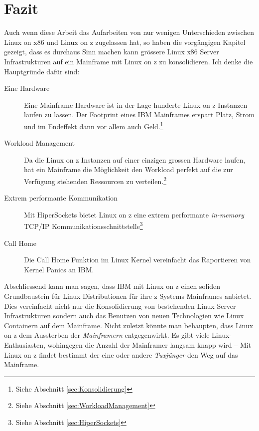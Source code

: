 \chapter{Fazit}
\label{cha:Schluss}

Auch wenn diese Arbeit das Aufarbeiten von nur wenigen Unterschieden zwischen Linux on x86 und Linux on z zugelassen hat, so haben die vorgängigen Kapitel gezeigt, dass es durchaus Sinn machen kann grössere Linux x86 Server Infrastrukturen auf ein Mainframe mit Linux on z zu konsolidieren.
Ich denke die Hauptgründe dafür sind:
\begin{description}
    \item[Eine Hardware]{Eine Mainframe Hardware ist in der Lage hunderte Linux on z Instanzen laufen zu lassen. Der Footprint eines IBM Mainframes erspart Platz, Strom und im Endeffekt dann vor allem auch Geld.\footnote{Siehe Abschnitt \ref{sec:Konsolidierung}}}
    \item[Workload Management]{Da die Linux on z Instanzen auf einer einzigen grossen Hardware laufen, hat ein Mainframe die Möglichkeit den Workload perfekt auf die zur Verfügung stehenden Ressourcen zu verteilen.\footnote{Siehe Abschnitt \ref{sec:WorkloadManagement}}}
    \item[Extrem performante Kommunikation]{Mit HiperSockets bietet Linux on z eine extrem performante \textit{in-memory} TCP/IP Kommunikationsschnittstelle\footnote{Siehe Abschnitt \ref{sec:HiperSockets}}}
    \item[Call Home]{Die Call Home Funktion im Linux Kernel vereinfacht das Raportieren von Kernel Panics an IBM.}
\end{description}

Abschliessend kann man sagen, dass IBM mit Linux on z einen soliden Grundbaustein für Linux Distributionen für ihre z Systems Mainframes anbietet. Dies vereinfacht nicht nur die Konsolidierung von bestehenden Linux Server Infrastrukturen sondern auch das Benutzen von neuen Technologien wie Linux Containern auf dem Mainframe.
Nicht zuletzt könnte man behaupten, dass Linux on z dem Aussterben der \textit{Mainframern} entgegenwirkt.
Es gibt viele Linux-Enthusiasten, wohingegen die Anzahl der Mainframer langsam knapp wird --
Mit Linux on z findet bestimmt der eine oder andere \textit{Tuxjünger} den Weg auf das Mainframe.
